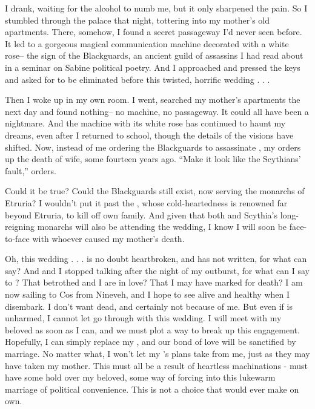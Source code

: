 \documentclass[char]{Kos}
\begin{document}
I drank, waiting for the alcohol to numb me, but it only sharpened the pain. So I stumbled through the palace that night, tottering into my mother's old apartments. There, somehow, I found a secret passageway I'd never seen before. It led to a gorgeous magical communication machine decorated with a white rose-- the sign of the Blackguards, an ancient guild of assassins I had read about in a seminar on Sabine political poetry. And I approached and pressed the keys and asked for \cGroom{} to be eliminated before this twisted, horrific wedding . . .

Then I woke up in my own room. I went, searched my mother's apartments the next day and found nothing-- no machine, no passageway. It could all have been a nightmare. And the machine with its white rose has continued to haunt my dreams, even after I returned to school, though the details of the visions have shifted. Now, instead of me ordering the Blackguards to assassinate \cGroom{}, my \cEtruriaKing{\parent} orders up the death of \cEtruriaKing{\their} wife, some fourteen years ago. ``Make it look like the Scythians' fault,'' \cEtruriaKing{\they} orders.

Could it be true? Could the Blackguards still exist, now serving the monarchs of Etruria? I wouldn't put it past the \cEtruriaKing{\monarch}, whose cold-heartedness is renowned far beyond Etruria, to kill off \cEtruriaKing{\their} own family. And given that both \cEtruriaKing{\they} and Scythia's long-reigning monarchs will also be attending the wedding, I know I will soon be face-to-face with whoever caused my mother's death.

Oh, this wedding . . . \cBride{} is no doubt heartbroken, and \cBride{\they} has not written, for what can \cBride{} say? And \cGroom{} and I stopped talking after the night of my outburst, for what can I say to \cGroom{\them}? That \cGroom{\their} betrothed and I are in love? That I may have marked \cGroom{\them} for death? I am now sailing to Cos from Nineveh, and I hope to see \cGroom{\them} alive and healthy when I disembark. I don't want \cGroom{\them} dead, and certainly not because of me. But even if \cGroom{\they} is unharmed, I cannot let \cGroom{\them} go through with this wedding. I will meet with my beloved as soon as I can, and we must plot a way to break up this engagement. Hopefully, I can simply replace my \cGroom{\sibling}, and our bond of love will be sanctified by marriage. No matter what, I won't let my \cEtruriaKing{\parent}'s plans take \cBride{} from me, just as they may have taken my mother. This must all be a result of \cEtruriaKing{\their} heartless machinations - \cEtruriaKing{\they} must have some hold over my beloved, some way of forcing \cBride{\them} into this lukewarm marriage of political convenience. This is not a choice that \cBride{\they} would ever make on \cBride{\their} own.
\end{document}

